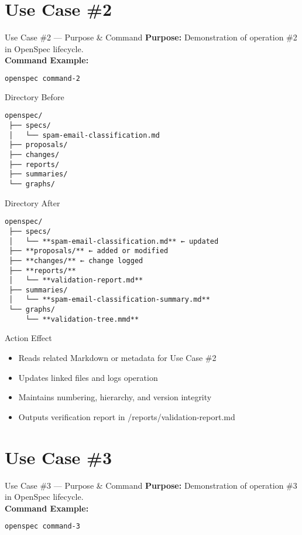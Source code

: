 \documentclass[aspectratio=169]{beamer}
\begin{document}
\section*{Use Case \#2}
\begin{frame}{Use Case \#2 --- Purpose \& Command}
\textbf{Purpose:} Demonstration of operation \#2 in OpenSpec lifecycle.\\[4pt]
\textbf{Command Example:}
\begin{lstlisting}[language=bash]
openspec command-2
\end{lstlisting}
\end{frame}

\begin{frame}{Directory Before}
\begin{lstlisting}
openspec/
 ├── specs/
 │   └── spam-email-classification.md
 ├── proposals/
 ├── changes/
 ├── reports/
 ├── summaries/
 └── graphs/
\end{lstlisting}
\end{frame}

\begin{frame}{Directory After}
\begin{lstlisting}
openspec/
 ├── specs/
 │   └── **spam-email-classification.md** ← updated
 ├── **proposals/** ← added or modified
 ├── **changes/** ← change logged
 ├── **reports/**
 │   └── **validation-report.md**
 ├── summaries/
 │   └── **spam-email-classification-summary.md**
 └── graphs/
     └── **validation-tree.mmd**
\end{lstlisting}
\end{frame}

\begin{frame}{Action Effect}
\begin{itemize}
  \item Reads related Markdown or metadata for Use Case \#2
  \item Updates linked files and logs operation
  \item Maintains numbering, hierarchy, and version integrity
  \item Outputs verification report in /reports/validation-report.md
\end{itemize}
\end{frame}

\section*{Use Case \#3}
\begin{frame}{Use Case \#3 --- Purpose \& Command}
\textbf{Purpose:} Demonstration of operation \#3 in OpenSpec lifecycle.\\[4pt]
\textbf{Command Example:}
\begin{lstlisting}[language=bash]
openspec command-3
\end{lstlisting}
\end{frame}
\end{document}
